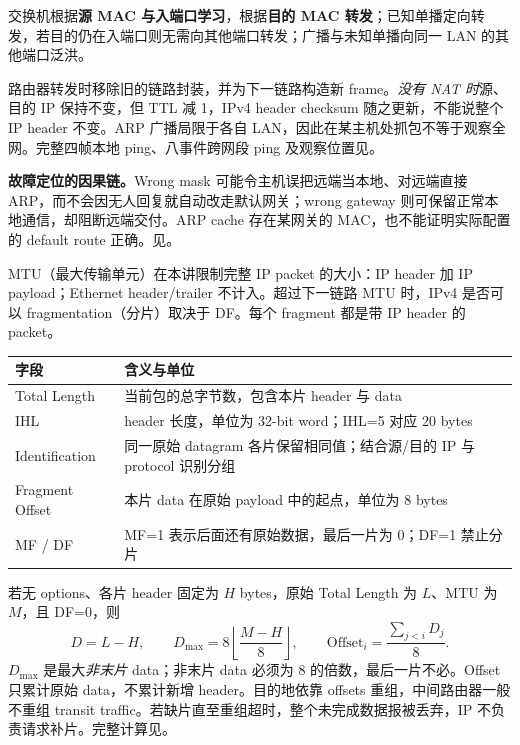 交换机根据\textbf{源 MAC 与入端口学习}，根据\textbf{目的 MAC 转发}；已知单播定向转发，若目的仍在入端口则无需向其他端口转发；广播与未知单播向同一 LAN 的其他端口泛洪。

路由器转发时移除旧的链路封装，并为下一链路构造新 frame。\emph{没有 NAT 时}源、目的 IP 保持不变，但 TTL 减 1，IPv4 header checksum 随之更新，不能说整个 IP header 不变。ARP 广播局限于各自 LAN，因此在某主机处抓包不等于观察全网。完整四帧本地 ping、八事件跨网段 ping 及观察位置见。

\textbf{故障定位的因果链。}Wrong mask 可能令主机误把远端当本地、对远端直接 ARP，而不会因无人回复就自动改走默认网关；wrong gateway 则可保留正常本地通信，却阻断远端交付。ARP cache 存在某网关的 MAC，也不能证明实际配置的 default route 正确。见。


MTU（最大传输单元）在本讲限制完整 IP packet 的大小：IP header 加 IP payload；Ethernet header/trailer 不计入。超过下一链路 MTU 时，IPv4 是否可以 fragmentation（分片）取决于 DF。每个 fragment 都是带 IP header 的 packet。

\begin{center}
\small
\begin{tabularx}{\textwidth}{@{}lX@{}}
\toprule
字段 & 含义与单位 \\
\midrule
Total Length & 当前包的总字节数，包含本片 header 与 data \\
IHL & header 长度，单位为 32-bit word；IHL=5 对应 20 bytes \\
Identification & 同一原始 datagram 各片保留相同值；结合源/目的 IP 与 protocol 识别分组 \\
Fragment Offset & 本片 data 在原始 payload 中的起点，单位为 8 bytes \\
MF / DF & MF=1 表示后面还有原始数据，最后一片为 0；DF=1 禁止分片 \\
\bottomrule
\end{tabularx}
\end{center}

若无 options、各片 header 固定为 $H$ bytes，原始 Total Length 为 $L$、MTU 为 $M$，且 DF=0，则
\[
 D=L-H,\qquad
 D_{\max}=8\left\lfloor\frac{M-H}{8}\right\rfloor,\qquad
 \boxed{\mathrm{Offset}_i=\frac{\sum_{j<i}D_j}{8}}.
\]
$D_{\max}$ 是最大\emph{非末片} data；非末片 data 必须为 8 的倍数，最后一片不必。Offset 只累计原始 data，不累计新增 header。目的地依靠 offsets 重组，中间路由器一般不重组 transit traffic。若缺片直至重组超时，整个未完成数据报被丢弃，IP 不负责请求补片。完整计算见。

